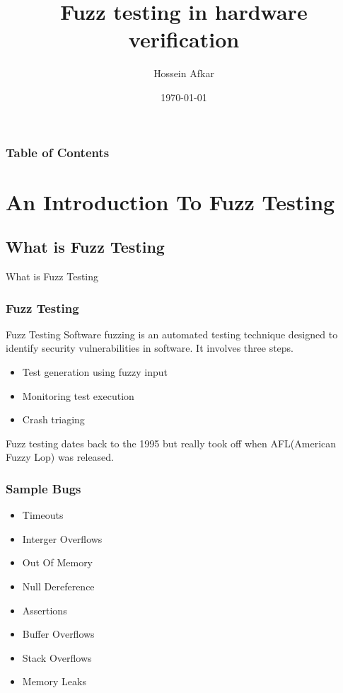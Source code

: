 \documentclass{beamer}
\title{Fuzz testing in hardware verification}
\author{Hossein Afkar}
\institute{University Of Tehran}
\date{\today}
\begin{document}
\frame{\titlepage}

\begin{frame}
    \frametitle{Table of Contents}
    \tableofcontents[hideallsubsections]
\end{frame}


\section{An Introduction To Fuzz Testing}
\subsection{What is Fuzz Testing}
\begin{frame}{What is Fuzz Testing}
    \frametitle{Fuzz Testing}
    \begin{block}{Fuzz Testing}
        Software fuzzing is an automated testing technique designed to identify
        security vulnerabilities in software. It involves three steps.
        \begin{itemize}
            \item Test generation using fuzzy input
            \item Monitoring test execution
            \item Crash triaging
        \end{itemize}
    \end{block}
    Fuzz testing dates back to the 1995 but really took off when AFL(American
    Fuzzy Lop) was released.
\end{frame}

\begin{frame}
    \frametitle{Sample Bugs}
    \begin{itemize}
        \item Timeouts
        \item Interger Overflows
        \item Out Of Memory
        \item Null Dereference
        \item Assertions
        \item Buffer Overflows
        \item Stack Overflows
        \item Memory Leaks
    \end{itemize}
\end{frame}
\end{document}
